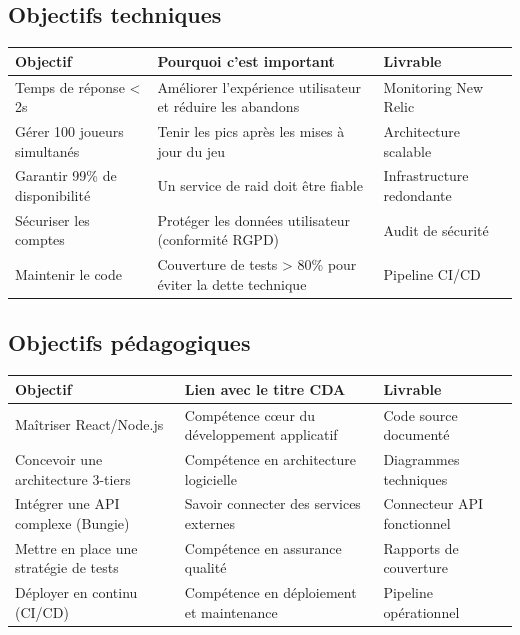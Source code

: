 \subsection*{Objectifs techniques}
\begin{center}
    \begin{tabular}{|p{4cm}|p{6cm}|p{3cm}|}
        \hline
        \textbf{Objectif} & \textbf{Pourquoi c'est important} & \textbf{Livrable} \\
        \hline
        Temps de réponse < 2s & Améliorer l'expérience utilisateur et réduire les abandons & Monitoring New Relic \\
        \hline
        Gérer 100 joueurs simultanés & Tenir les pics après les mises à jour du jeu & Architecture scalable \\
        \hline
        Garantir 99\% de disponibilité & Un service de raid doit être fiable & Infrastructure redondante \\
        \hline
        Sécuriser les comptes & Protéger les données utilisateur (conformité RGPD) & Audit de sécurité \\
        \hline
        Maintenir le code & Couverture de tests > 80\% pour éviter la dette technique & Pipeline CI/CD \\
        \hline
    \end{tabular}
\end{center}

\subsection*{Objectifs pédagogiques}
\begin{center}
    \begin{tabular}{|p{4cm}|p{6cm}|p{3cm}|}
        \hline
        \textbf{Objectif} & \textbf{Lien avec le titre CDA} & \textbf{Livrable} \\
        \hline
        Maîtriser React/Node.js & Compétence cœur du développement applicatif & Code source documenté \\
        \hline
        Concevoir une architecture 3-tiers & Compétence en architecture logicielle & Diagrammes techniques \\
        \hline
        Intégrer une API complexe (Bungie) & Savoir connecter des services externes & Connecteur API fonctionnel \\
        \hline
        Mettre en place une stratégie de tests & Compétence en assurance qualité & Rapports de couverture \\
        \hline
        Déployer en continu (CI/CD) & Compétence en déploiement et maintenance & Pipeline opérationnel \\
        \hline
    \end{tabular}
\end{center}

